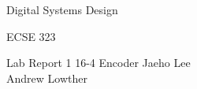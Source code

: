 \documentclass[12pt,letterpaper,titlepage]{article}
\begin{document}
\begin{titlepage}
	\centering
	{\LARGE Digital Systems Design \par}
	{\LARGE ECSE 323 \par}
	\vspace{.5cm}
	{\LARGE Lab Report 1}
	{\LARGE 16-4 Encoder}
	\vfill
	Jaeho Lee \\
	Andrew Lowther \\
\end{titlepage}




\end{document}
